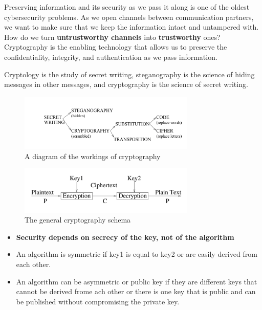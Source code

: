 \documentclass[11pt]{article}
\begin{document}
Preserving information and its security as we pass it along is one of the oldest cybersecurity problems.
As we open channels between communication partners, we want to make sure that we keep the information intact and untampered with.
How do we turn \textbf{untrustworthy channels} into \textbf{trustworthy} ones?
Cryptography is the enabling technology that allows us to preserve the confidentiality, integrity, and authentication as we pass information.

Cryptology is the study of secret writing, steganography is the science of hiding messages in other messages, and cryptography is the science of secret writing.

\begin{figure}[htbp]
  \centerline{\includegraphics[width=0.75\textwidth]{../../images/cryptography_diagram.png}}
  \caption{A diagram of the workings of cryptography}
  \label{fig:cryptography_diagram}
\end{figure}

\begin{figure}[htbp]
  \centerline{\includegraphics[width=0.75\textwidth]{../../images/general_cryptography_schema.png}}
  \caption{The general cryptography schema}
  \label{fig:general_cryptography_schema}
\end{figure}

\begin{itemize}
    \item \textbf{Security depends on secrecy of the key, not of the algorithm}
    \item An algorithm is symmetric if key1 is equal to key2 or are easily derived from each other.
    \item An algorithm can be asymmetric or public key if they are different keys that cannot be derived frome ach other or there is one key that is public and can be published without compromising the private key.
\end{itemize}
\end{document}
